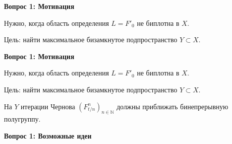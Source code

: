 \documentclass[11pt]{article}
\newcommand{\N}{\mathbb{N}}
\begin{document}
\newpage

\begin{center}
{\color{notaeYELLOW}\bfseries\fontsize{44}{52}\selectfont Вопрос 1: Мотивация}
\end{center}
\vspace*{\fill}
\begin{center}
\fontsize{36}{43}\selectfont
\parbox{\linewidth}{\centering\noindent Нужно, когда область определения $L=F'_0$ не биплотна в $X$.
\par}\vspace{0.4in}
\parbox{\linewidth}{\centering\noindent Цель: найти максимальное бизамкнутое подпространство $Y\subset X$.
\par}\vspace{0.4in}
\end{center}
\vspace*{\fill}

\newpage

\begin{center}
{\color{notaeYELLOW}\bfseries\fontsize{44}{52}\selectfont Вопрос 1: Мотивация}
\end{center}
\vspace*{\fill}
\begin{center}
\fontsize{36}{43}\selectfont
\parbox{\linewidth}{\centering\noindent Нужно, когда область определения $L=F'_0$ не биплотна в $X$.
\par}\vspace{0.4in}
\parbox{\linewidth}{\centering\noindent Цель: найти максимальное бизамкнутое подпространство $Y\subset X$.
\par}\vspace{0.4in}
\parbox{\linewidth}{\centering\noindent На $Y$ итерации Чернова $(F_{t/n}^n)_{n\in\N}$ должны приближать бинепрерывную полугруппу.
\par}\vspace{0.4in}
\end{center}
\vspace*{\fill}

\newpage

\begin{center}
{\color{notaeYELLOW}\bfseries\fontsize{44}{52}\selectfont Вопрос 1: Возможные идеи}
\end{center}
\vspace*{\fill}
\begin{center}
\fontsize{36}{43}\selectfont
\end{center}
\vspace*{\fill}
\end{document}
